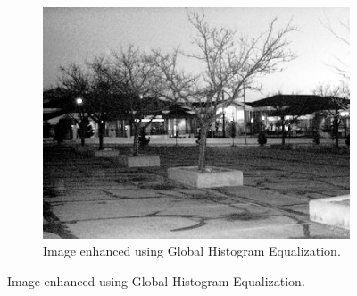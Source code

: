 \documentclass[a4paper, landscape]{article}
\begin{document}
\begin{figure}
\begin{subfigure}{0.32\linewidth}
        \centering
        \includegraphics[width=\linewidth]{global_histogram_LC1.jpg}
        \caption{Image enhanced using Global Histogram Equalization.}
    \end{subfigure}
\end{figure}
\end{document}
